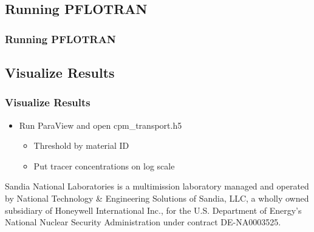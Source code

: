 \documentclass{beamer}
\begin{document}
\subsection{Running PFLOTRAN}

\begin{frame}[fragile]\frametitle{Running PFLOTRAN}


\end{frame}

\subsection{Visualize Results}

\begin{frame}[fragile]\frametitle{Visualize Results}
	
	\begin{itemize}
		\item Run ParaView and open cpm\_transport.h5 
		\begin{itemize}
			\item Threshold by material ID
			\item Put tracer concentrations on log scale
		\end{itemize}
	\end{itemize}
\end{frame}

\begin{frame}[fragile]
	
	Sandia National Laboratories is a multimission laboratory managed and operated by National Technology \& Engineering Solutions of Sandia, LLC, a wholly owned subsidiary of Honeywell International Inc., for the U.S. Department of Energy’s National Nuclear Security Administration under contract DE-NA0003525.
	
\end{frame}
\end{document}

